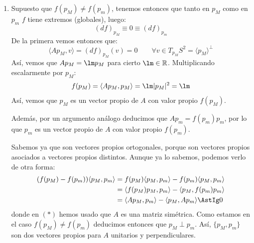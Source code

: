 \begin{ejercicio}
\begin{enumerate}
\begin{enumerate}[label=\alph*)]
                    Así, todas las bases ortonormales de $\mathbb{R}^3$ diagonalizan la matriz $A$, y sus valores propios son $\lm,\lm$ y $\lm$.
                \item Supuesto que $f(p_M)\neq f(p_m)$, tenemos entonces que tanto en $p_M$ como en $p_m$ $f$ tiene extremos (globales), luego:
                    \begin{equation*}
                        (d f)_{p_M} \equiv 0 \equiv (d f)_{p_m}
                    \end{equation*}
                    De la primera vemos entonces que:
                    \begin{equation*}
                        \langle Ap_M,v \rangle = (d f)_{p_M}(v) = 0 \qquad \forall v\in T_{p_M}S^2 = \langle p_M \rangle^\perp
                    \end{equation*}
                    Así, vemos que $Ap_M = \lm p_M$ para cierto $\lm\in \mathbb{R}$. Multiplicando escalarmente por $p_M$:
                    \begin{equation*}
                        f(p_M) = \langle Ap_M,p_M \rangle  = \lm |p_M|^2 = \lm
                    \end{equation*}
                    Así, vemos que $p_M$ es un vector propio de $A$ con valor propio $f(p_M)$.

                    Además, por un argumento análogo deducimos que $Ap_m = f(p_m)p_m$, por lo que $p_m$ es un vector propio de $A$ con valor propio $f(p_m)$.

                    Sabemos ya que son vectores propios ortogonales, porque son vectores propios asociados a vectores propios distintos. Aunque ya lo sabemos, podemos verlo de otra forma:
                    \begin{align*}
                        (f(p_M)-f(p_m))\langle p_M,p_m \rangle  &= f(p_M)\langle p_M,p_m \rangle  - f(p_m)\langle p_M,p_m \rangle  \\
                                                                &= \langle f(p_M)p_M,p_m \rangle  - \langle p_M,f(p_m)p_m \rangle  \\
                                                                &= \langle Ap_M,p_m \rangle  - \langle p_M,Ap_m \rangle  \AstIg 0
                    \end{align*}
                    donde en $(\ast)$ hemos usado que $A$ es una matriz simétrica. Como estamos en el caso $f(p_M)\neq f(p_m)$ deducimos entonces que $p_M\perp p_m$. Así, $\{p_M,p_m\}$ son dos vectores propios para $A$ unitarios y perpendiculares. 


\end{enumerate}
\end{enumerate}
\end{ejercicio}
